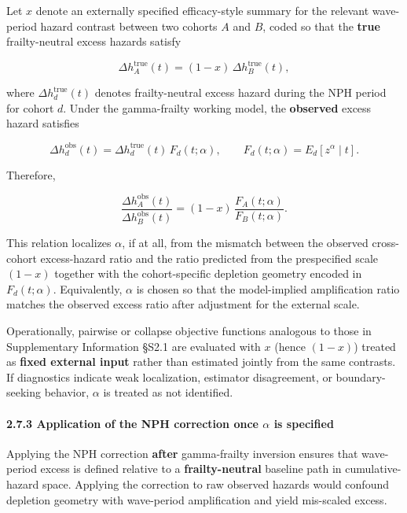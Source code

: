 \documentclass[
]{article}
\begin{document}
Let \(x\) denote an externally specified efficacy-style summary for the
relevant wave-period hazard contrast between two cohorts \(A\) and
\(B\), coded so that the \textbf{true} frailty-neutral excess hazards
satisfy

\[
\Delta h_A^{\mathrm{true}}(t) = (1-x)\,\Delta h_B^{\mathrm{true}}(t),
\]

where \(\Delta h_d^{\mathrm{true}}(t)\) denotes frailty-neutral excess
hazard during the NPH period for cohort \(d\). Under the gamma-frailty
working model, the \textbf{observed} excess hazard satisfies

\[
\Delta h_d^{\mathrm{obs}}(t)=\Delta h_d^{\mathrm{true}}(t)\,F_d(t;\alpha),
\qquad
F_d(t;\alpha)=E_d[z^{\alpha}\mid t].
\]

Therefore,

\[
\frac{\Delta h_A^{\mathrm{obs}}(t)}{\Delta h_B^{\mathrm{obs}}(t)}
=
(1-x)\,\frac{F_A(t;\alpha)}{F_B(t;\alpha)}.
\]

This relation localizes \(\alpha\), if at all, from the mismatch between
the observed cross-cohort excess-hazard ratio and the ratio predicted
from the prespecified scale \((1-x)\) together with the cohort-specific
depletion geometry encoded in \(F_d(t;\alpha)\). Equivalently,
\(\alpha\) is chosen so that the model-implied amplification ratio
matches the observed excess ratio after adjustment for the external
scale.

Operationally, pairwise or collapse objective functions analogous to
those in Supplementary Information §S2.1 are evaluated with \(x\) (hence
\((1-x)\)) treated as \textbf{fixed external input} rather than
estimated jointly from the same contrasts. If diagnostics indicate weak
localization, estimator disagreement, or boundary-seeking behavior,
\(\alpha\) is treated as not identified.

\paragraph{\texorpdfstring{2.7.3 Application of the NPH correction once
\(\alpha\) is
specified}{2.7.3 Application of the NPH correction once \textbackslash alpha is specified}}\label{application-of-the-nph-correction-once-alpha-is-specified}

Applying the NPH correction \textbf{after} gamma-frailty inversion
ensures that wave-period excess is defined relative to a
\textbf{frailty-neutral} baseline path in cumulative-hazard space.
Applying the correction to raw observed hazards would confound depletion
geometry with wave-period amplification and yield mis-scaled excess.
\end{document}
